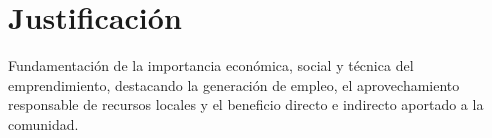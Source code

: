 \section{Justificación}
\label{sec:justificacion_emprendimiento}

Fundamentación de la importancia económica, social y técnica del emprendimiento, destacando la generación de empleo, el aprovechamiento responsable de recursos locales y el beneficio directo e indirecto aportado a la comunidad.
